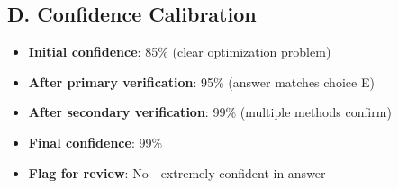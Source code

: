 \documentclass[12pt]{article}
\begin{document}
\begin{verificationbox}
\subsection*{D. Confidence Calibration}

\begin{itemize}[leftmargin=*]
    \item \textbf{Initial confidence}: 85\% (clear optimization problem)
    \item \textbf{After primary verification}: 95\% (answer matches choice E)
    \item \textbf{After secondary verification}: 99\% (multiple methods confirm)
    \item \textbf{Final confidence}: 99\%
    \item \textbf{Flag for review}: No - extremely confident in answer
\end{itemize}
\end{verificationbox}
\end{document}
